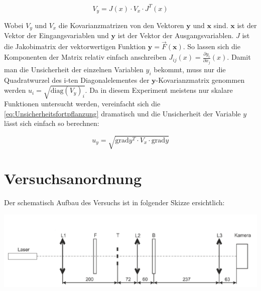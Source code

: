 \documentclass[11pt,ngerman]{scrartcl}
\begin{document}
\begin{equation}
	\label{eq:Unsicherheitsfortpflanzung}
	V_y = J(x) \cdot V_x \cdot J^{T}(x)
\end{equation}

\noindent Wobei $V_y$ und $V_x$ die Kovarianzmatrizen von den Vektoren $\bm{y}$ und $\bm{x}$ sind.
$\bm{x}$ ist der Vektor der Eingangsvariablen und $\bm{y}$ ist der Vektor der Ausgangsvariablen.
$J$ ist die Jakobimatrix der vektorwertigen Funktion $\bm{y} = \vec{F}(\bm{x})$.
So lassen sich die Komponenten der Matrix relativ einfach anschreiben $J_{ij}(x) = \frac{\partial{y_i}}{\partial{x_j}}(x)$.
Damit man die Unsicherheit der einzelnen Variablen $y_i$ bekommt, muss nur die Quadratwurzel des i-ten Diagonalelementes der
$\bm{y}$-Kovarianzmatrix genommen werden $u_i= \sqrt{\mathrm{diag}(V_y)_i}$.
Da in diesem Experiment meistens nur skalare Funktionen untersucht werden, vereinfacht
sich die \autoref{eq:Unsicherheitsfortpflanzung} dramatisch und die Unsicherheit
der Variable $y$ lässt sich einfach so berechnen:

\begin{equation}
	\label{eq:graduncentainty}
	u_y = \sqrt{\mathrm{grad} y^T \cdot V_x \cdot \mathrm{grad} y}
\end{equation}

\vspace{5mm}

\newpage
\section{Versuchsanordnung}\label{sec:Versuchsanordnung}

Der schematisch Aufbau des Versuchs ist in folgender Skizze ersichtlich:

\begin{center}
	\begin{minipage}[t]{\textwidth}
		\includegraphics[width=\textwidth]{skizze}
		\label{fig:skizze}
	\end{minipage}
\end{center}
\end{document}
